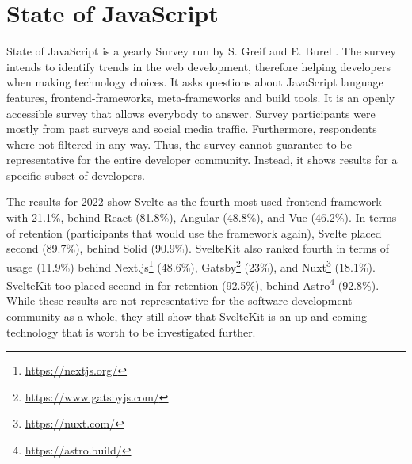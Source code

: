 
\section{State of JavaScript}
\label{sec:state-of-js}
State of JavaScript is a yearly Survey run by S. Greif and E. Burel \cite{greif_state_2022}. The survey intends to identify trends in the web development, therefore helping developers when making technology choices. It asks questions about JavaScript language features, frontend-frameworks, meta-frameworks and build tools. It is an openly accessible survey that allows everybody to answer. Survey participants were mostly from past surveys and social media traffic. Furthermore, respondents where not filtered in any way. Thus, the survey cannot guarantee to be representative for the entire developer community. Instead, it shows results for a specific subset of developers.

The results for 2022 show Svelte as the fourth most used frontend framework with 21.1\%, behind React (81.8\%), Angular (48.8\%), and Vue (46.2\%). In terms of retention (participants that would use the framework again), Svelte placed second (89.7\%), behind Solid (90.9\%). SvelteKit also ranked fourth in terms of usage (11.9\%) behind Next.js\footnote{\url{https://nextjs.org/}} (48.6\%), Gatsby\footnote{\url{https://www.gatsbyjs.com/}} (23\%), and Nuxt\footnote{\url{https://nuxt.com/}} (18.1\%). SvelteKit too placed second in for retention (92.5\%), behind Astro\footnote{\url{https://astro.build/}} (92.8\%). While these results are not representative for the software development community as a whole, they still show that SvelteKit is an up and coming technology that is worth to be investigated further.